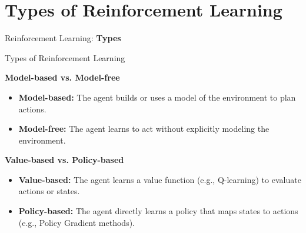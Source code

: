 \section{Types of Reinforcement Learning}
\begin{frame}{}
    \LARGE Reinforcement Learning: \textbf{Types}
\end{frame}

\begin{frame}[allowframebreaks]{Types of Reinforcement Learning}
    \begin{figure}
        \centering
    \end{figure}
\framebreak
    \textbf{Model-based vs. Model-free}
    \begin{itemize}
        \item \textbf{Model-based:} The agent builds or uses a model of the environment to plan actions.
        \item \textbf{Model-free:} The agent learns to act without explicitly modeling the environment.
    \end{itemize}
    \vspace{1em}
    \textbf{Value-based vs. Policy-based}
    \begin{itemize}
        \item \textbf{Value-based:} The agent learns a value function (e.g., Q-learning) to evaluate actions or states.
        \item \textbf{Policy-based:} The agent directly learns a policy that maps states to actions (e.g., Policy Gradient methods).
    \end{itemize}
\framebreak
    \begin{figure}
        \centering
    \end{figure}
\end{frame}